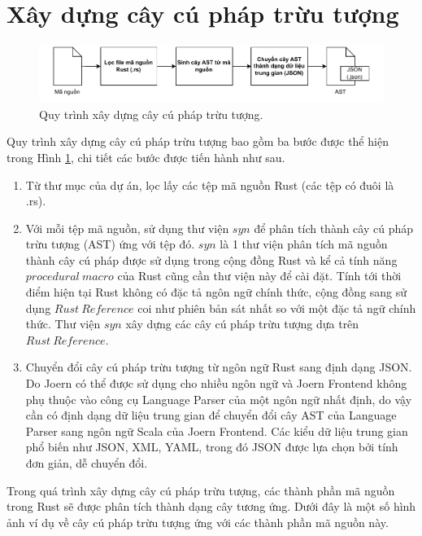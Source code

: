 \section{Xây dựng cây cú pháp trừu tượng}

\begin{figure}[H]
  \includegraphics[width=1\columnwidth]{figures/c3/c3_flow_ast.drawio.pdf}
  \centering
  \caption{Quy trình xây dựng cây cú pháp trừu tượng.}
  \label{img:c3_flow_ast}
\end{figure}

Quy trình xây dựng cây cú pháp trừu tượng bao gồm ba bước được thể hiện trong Hình \ref{img:c3_flow_ast}, chi tiết các bước được tiến hành như sau.

\begin{enumerate}
  \item Từ thư mục của dự án, lọc lấy các tệp mã nguồn Rust (các tệp có đuôi là .rs).
  \item Với mỗi tệp mã nguồn, sử dụng thư viện $syn$ \cite{synRust} để phân tích thành cây cú pháp trừu tượng (AST) ứng với tệp đó.
  $syn$ là 1 thư viện phân tích mã nguồn thành cây cú pháp được sử dụng trong cộng đồng Rust và kể cả tính năng $procedural\ macro$ \cite{rustlangProceduralMacros} của Rust cũng cần thư viện này để cài đặt.
  Tính tới thời điểm hiện tại Rust không có đặc tả ngôn ngữ chính thức, cộng đồng sang sử dụng $Rust\ Reference$ \cite{rustReference} coi như phiên bản sát nhất so với một đặc tả ngữ chính thức.
  Thư viện $syn$ xây dựng các cây cú pháp trừu tượng dựa trên $Rust\ Reference$.
  \item Chuyển đổi cây cú pháp trừu tượng từ ngôn ngữ Rust sang định dạng JSON.
  Do Joern có thể được sử dụng cho nhiều ngôn ngữ và Joern Frontend không phụ thuộc vào công cụ Language Parser của một ngôn ngữ nhất định, do vậy cần có định dạng dữ liệu trung gian để chuyển đổi cây AST của Language Parser sang ngôn ngữ Scala của Joern Frontend. Các kiểu dữ liệu trung gian phổ biến như JSON, XML, YAML, trong đó JSON được lựa chọn bởi tính đơn giản, dễ chuyển đổi.
\end{enumerate}

Trong quá trình xây dựng cây cú pháp trừu tượng, các thành phần mã nguồn trong Rust sẽ được phân tích thành dạng cây tương ứng.
Dưới đây là một số hình ảnh ví dụ về cây cú pháp trừu tượng ứng với các thành phần mã nguồn này.

